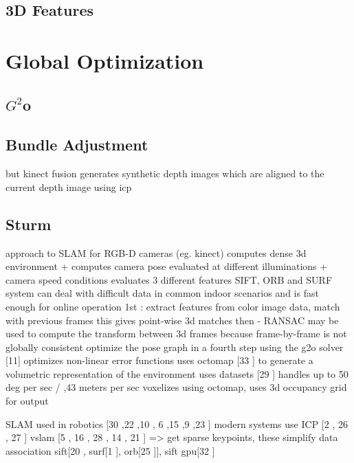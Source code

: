 \subsection{3D Features}

\section{Global Optimization}
\subsection{$G^2$o}
\subsection{Bundle Adjustment}








but kinect fusion generates synthetic depth images which are aligned to the current depth image using icp


\subsection{Sturm}

approach to SLAM for RGB-D cameras (eg. kinect)
computes dense 3d environment + computes camera pose
evaluated at different illuminations + camera speed conditions
evaluates 3 different features SIFT, ORB and SURF
system can deal with difficult data in common indoor scenarios and is fast enough for online operation
1st : extract features from color image data, match with previous frames
this gives point-wise 3d matches
then - RANSAC may be used to compute the transform between 3d frames
because frame-by-frame is not globally consistent
optimize the pose graph in a fourth step using the g2o solver [11] optimizes non-linear error functions
uses octomap [33 \cite{Wurm10Octomap}] to generate a volumetric representation of the environment
uses datasets [29 \cite{Sturm11Towards}]
handles up to 50 deg per sec / ,43 meters per sec
voxelizes using octomap, uses 3d occupancy grid for output

SLAM used in robotics [30 \cite{Thrun02Robotic},22 \cite{Nuchter056d},10 \cite{Grisetti07Efficient}, 6 \cite{Dellaert06Square},15 \cite{Kaess08Isam},9 \cite{Frese05Multilevel},23 \cite{Olson06Fast}]
modern systems use ICP [2 \cite{Besl92Method}, 26 \cite{Rusinkiewicz01Efficient}, 27 \cite{Segal09Generalized}]
vslam [5 \cite{Davison03Real} , 16 \cite{Klein07Parallel}, 28 \cite{Strasdat10Real}, 14 \cite{Jin00Real}, 21 \cite{Nister05Preemptive}] => get sparse keypoints,  
these simplify data association
sift[20 \cite{Lowe04Distinctive}, surf[1 \cite{Bay06Surf,Bay08Speeded}], orb[25 \cite{Rublee11Orb}]], sift gpu[32 \cite{Wu07Siftgpu}]


